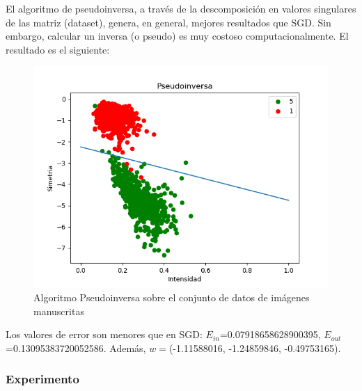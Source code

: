 El algoritmo de pseudoinversa, a través de la descomposición en valores singulares de las matriz (dataset), genera, en general, mejores resultados que SGD. Sin embargo, calcular un inversa (o pseudo) es muy costoso computacionalmente. El resultado es el siguiente:

\begin{figure}[H] %
	\centering
	\includegraphics[scale=0.6]{pseudoinversa.png}  %
	\caption{Algoritmo Pseudoinversa sobre el conjunto de datos de imágenes manuscritas} 
	\label{fig:pseud}
\end{figure}

Los valores de error son menores que en SGD: $E_{in}$=0.07918658628900395, $E_{out}$=0.13095383720052586. Además, $w=$(-1.11588016, -1.24859846, -0.49753165).
\newpage

\subsubsection{Experimento}

